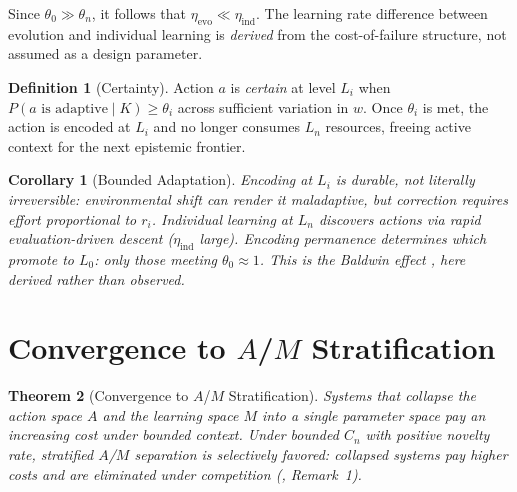 \documentclass[11pt]{article}
\newtheorem{theorem}{Theorem}
\newtheorem{corollary}[theorem]{Corollary}
\theoremstyle{definition}
\newtheorem{definition}{Definition}
\theoremstyle{remark}
\begin{document}
Since $\theta_0 \gg \theta_n$, it follows that
$\eta_{\mathrm{evo}} \ll \eta_{\mathrm{ind}}$. The learning rate
difference between evolution and individual learning is \emph{derived}
from the cost-of-failure structure, not assumed as a design parameter.

\begin{definition}[Certainty]
\label{def:certain}
Action $a$ is \emph{certain} at level $L_i$ when
$P(\text{$a$ is adaptive} \mid K) \geq \theta_i$ across
sufficient variation in $w$. Once $\theta_i$ is met, the action is
encoded at $L_i$ and no longer consumes $L_n$ resources, freeing
active context for the next epistemic frontier.
\end{definition}

\begin{corollary}[Bounded Adaptation]
\label{cor:bounded}
Encoding at $L_i$ is durable, not literally irreversible:
environmental shift can render it maladaptive, but correction requires
effort proportional to $r_i$. Individual learning at $L_n$ discovers
actions via rapid evaluation-driven descent ($\eta_{\mathrm{ind}}$
large). Encoding permanence determines which promote to $L_0$: only
those meeting $\theta_0 \approx 1$. This is the Baldwin effect
\cite{Hinton1987}, here derived rather than observed.
\end{corollary}

\section{Convergence to $A$/$M$ Stratification}
\label{sec:type}

\begin{theorem}[Convergence to $A$/$M$ Stratification]
\label{thm:type}
Systems that collapse the action space $A$ and the learning space $M$
into a single parameter space pay an increasing cost under bounded
context. Under bounded $C_n$ with positive novelty rate, stratified
$A$/$M$ separation is selectively favored: collapsed systems pay
higher costs and are eliminated under competition
(\cite{McCarthy2026a}, Remark~1).
\end{theorem}
\end{document}
